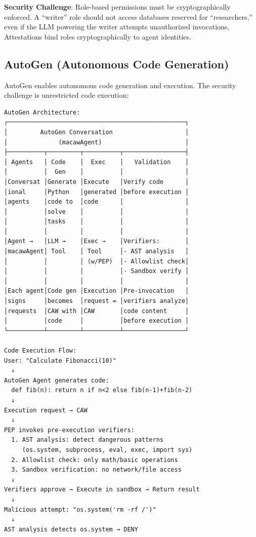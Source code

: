 {\textbf{Security Challenge}: Role-based permissions must be cryptographically enforced. A ``writer'' role should not access databases reserved for ``researchers,'' even if the LLM powering the writer attempts unauthorized invocations. Attestations bind roles cryptographically to agent identities.

\subsection*{AutoGen (Autonomous Code Generation)}

AutoGen enables autonomous code generation and execution. The security challenge is unrestricted code execution:

{\tiny
\begin{verbatim}
AutoGen Architecture:
┌─────────────────────────────────────────────────┐
│         AutoGen Conversation                    │
│              (macawAgent)                       │
├──────────┬─────────┬──────────┬─────────────────┤
│ Agents   │ Code    │  Exec    │   Validation    │
│          │  Gen    │          │                 │
│Conversat │Generate │Execute   │Verify code      │
│ional     │Python   │generated │before execution │
│agents    │code to  │code      │                 │
│          │solve    │          │                 │
│          │tasks    │          │                 │
│          │         │          │                 │
│Agent →   │LLM →    │Exec →    │Verifiers:       │
│macawAgent│ Tool    │ Tool     │- AST analysis   │
│          │         │ (w/PEP)  │- Allowlist check│
│          │         │          │- Sandbox verify │
│          │         │          │                 │
│Each agent│Code gen │Execution │Pre-invocation   │
│signs     │becomes  │request = │verifiers analyze│
│requests  │CAW with │CAW       │code content     │
│          │code     │          │before execution │
└──────────┴─────────┴──────────┴─────────────────┘

Code Execution Flow:
User: "Calculate Fibonacci(10)"
  ↓
AutoGen Agent generates code:
  def fib(n): return n if n<2 else fib(n-1)+fib(n-2)
  ↓
Execution request → CAW
  ↓
PEP invokes pre-execution verifiers:
  1. AST analysis: detect dangerous patterns
     (os.system, subprocess, eval, exec, import sys)
  2. Allowlist check: only math/basic operations
  3. Sandbox verification: no network/file access
  ↓
Verifiers approve → Execute in sandbox → Return result
  ↓
Malicious attempt: "os.system('rm -rf /')"
  ↓
AST analysis detects os.system → DENY
\end{verbatim}}

}
